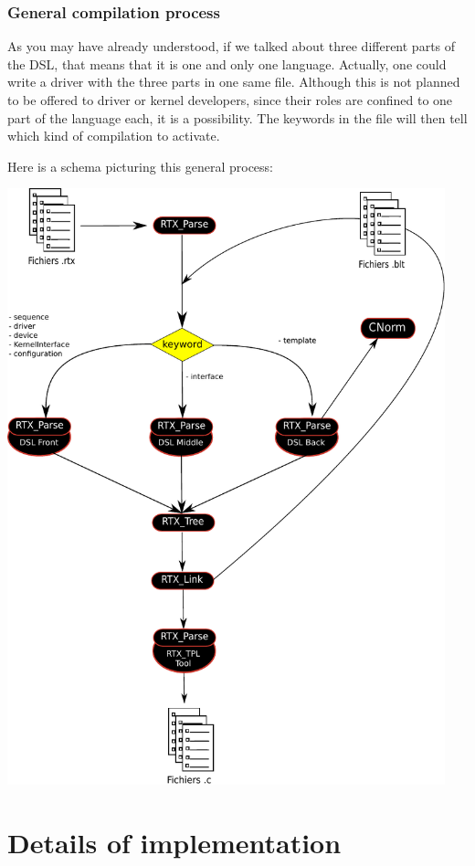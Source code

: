 \documentclass[american]{rtxreport}
\begin{document}
\subsection{General compilation process}

As you may have already understood, if we talked about three different parts of
the DSL, that means that it is one and only one language. Actually, one could
write a driver with the three parts in one same file. Although this is not
planned to be offered to driver or kernel developers, since their roles are
confined to one part of the language each, it is a possibility. The keywords in
the file will then tell which kind of compilation to activate.

Here is a schema picturing this general process:

\includegraphics[width=0.95\textwidth]{logigramme.pdf}



\chapter{Details of implementation}
\end{document}
